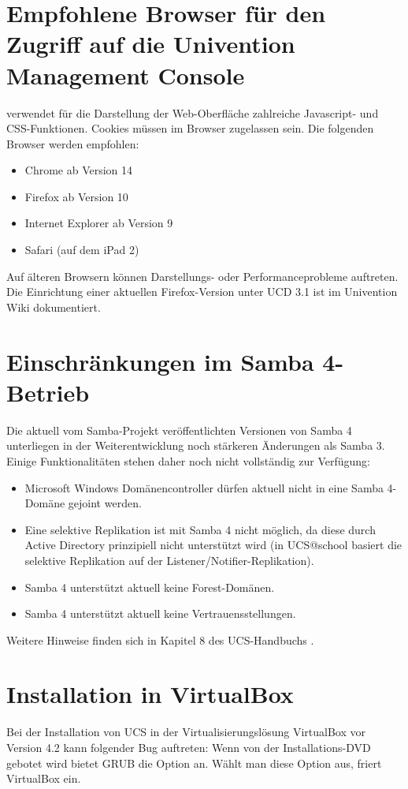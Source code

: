 \section{Empfohlene Browser für den Zugriff auf die Univention Management Console}

\ucsUMC{} verwendet für die Darstellung der Web-Oberfläche zahlreiche
Javascript- und CSS-Funktionen. Cookies müssen im Browser zugelassen
sein. Die folgenden Browser werden empfohlen:

\begin{itemize}
\item Chrome ab Version 14
\item Firefox ab Version 10
\item Internet Explorer ab Version 9
\item Safari (auf dem iPad 2)
\end{itemize}

Auf älteren Browsern können Darstellungs- oder Performanceprobleme
auftreten. Die Einrichtung einer aktuellen Firefox-Version unter UCD
3.1 ist im Univention Wiki \cite{ucd-firefox7} dokumentiert.

\section{Einschränkungen im Samba 4-Betrieb}

Die aktuell vom Samba-Projekt veröffentlichten Versionen von Samba 4
unterliegen in der Weiterentwicklung noch stärkeren Änderungen als Samba
3. Einige Funktionalitäten stehen daher noch nicht vollständig zur Verfügung:

\begin{itemize}
\item Microsoft Windows Domänencontroller dürfen aktuell nicht in eine Samba 4-Domäne
gejoint werden.
\item Eine selektive Replikation ist mit Samba 4 nicht möglich, da diese durch
Active Directory prinzipiell nicht unterstützt wird (in UCS@school
basiert die selektive Replikation auf der Listener/Notifier-Replikation).
\item Samba 4 unterstützt aktuell keine Forest-Domänen. 
\item Samba 4 unterstützt aktuell keine Vertrauensstellungen.
\end{itemize}

Weitere Hinweise finden sich in Kapitel 8 des UCS-Handbuchs \cite{UCS-Handbuch}.

\section{Installation in VirtualBox}
Bei der Installation von UCS in der Virtualisierungslösung VirtualBox vor Version 4.2 kann folgender Bug auftreten:
Wenn von der Installations-DVD gebotet wird bietet
GRUB die Option  an. Wählt man diese Option aus, friert VirtualBox ein.

